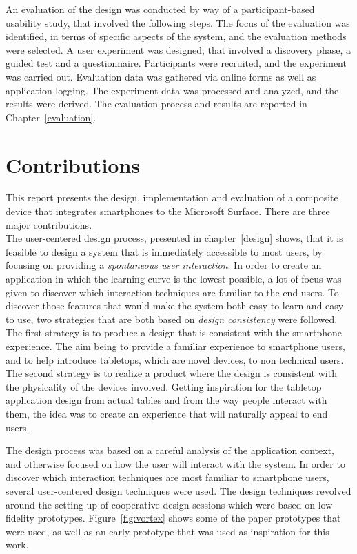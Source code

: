 An evaluation of the design was conducted by way of a participant-based usability study, that involved the following steps.
The focus of the evaluation was identified, in terms of specific aspects of the system, and the evaluation methods were selected.
A user experiment was designed, that involved a discovery phase, a guided test and a questionnaire.
Participants were recruited, and the experiment was carried out.
Evaluation data was gathered via online forms as well as application logging.
The experiment data was processed and analyzed, and the results were derived.
The evaluation process and results are reported in Chapter~\ref{evaluation}.

\section{Contributions}

This report presents the design, implementation and evaluation of a composite device that integrates smartphones to the Microsoft Surface.
There are three major contributions.
\\
\linebreak
The user-centered design process, presented in chapter~\ref{design} shows, that it is feasible to design a system that is immediately accessible to most users, by focusing on providing a \emph{spontaneous user interaction}.
In order to create an application in which the learning curve is the lowest possible, a lot of focus was given to discover which interaction techniques are familiar to the end users.
To discover those features that would make the system both easy to learn and easy to use, two strategies that are both based on \emph{design consistency} were followed.
The first strategy is to produce a design that is consistent with the smartphone experience.
The aim being to provide a familiar experience to smartphone users, and to help introduce tabletops, which are novel devices, to non technical users.
The second strategy is to realize a product where the design is consistent with the physicality of the devices involved.
Getting inspiration for the tabletop application design from actual tables and from the way people interact with them, the idea was to create an experience that will naturally appeal to end users. 

The design process was based on a careful analysis of the application context, and otherwise focused on how the user will interact with the system.
In order to discover which interaction techniques are most familiar to smartphone users, several user-centered design techniques were used.
The design techniques revolved around the setting up of cooperative design sessions which were based on low-fidelity prototypes.
Figure~\ref{fig:vortex} shows some of the paper prototypes that were used, as well as an early prototype that was used as inspiration for this work.

